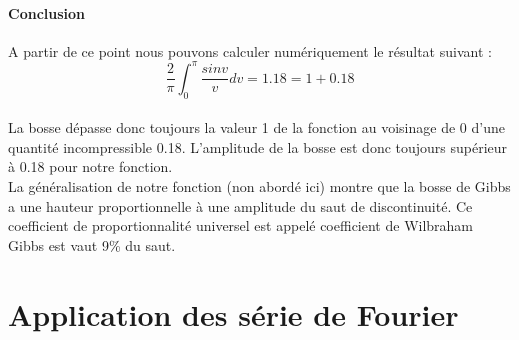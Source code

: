 \documentclass[a4paper,12pt]{report}
\begin{document}
		\subsubsection{Conclusion}
A partir de ce point nous pouvons calculer num\'eriquement le r\'esultat suivant :
$$\frac{2}{\pi} \displaystyle\int_{0}^{\pi}\frac{sin v}{v}dv = 1.18 = 1 + 0.18$$\\
La bosse d\'epasse donc toujours la valeur 1 de la fonction au voisinage de 0 d'une quantit\'e incompressible 0.18. L'amplitude de la bosse est donc toujours sup\'erieur \`a 0.18 pour notre fonction.\\
La g\'en\'eralisation de notre fonction (non abord\'e ici) montre que la bosse de Gibbs a une hauteur proportionnelle \`a une amplitude du saut de discontinuit\'e. Ce coefficient de proportionnalit\'e universel est appel\'e coefficient de Wilbraham Gibbs est vaut 9\% du saut.


\chapter{Application des s\'erie de Fourier}
\end{document}
